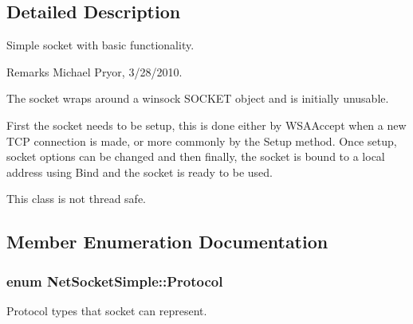 \subsection{Detailed Description}
Simple socket with basic functionality. \begin{DoxyRemark}{Remarks}
Michael Pryor, 3/28/2010.
\end{DoxyRemark}
The socket wraps around a winsock SOCKET object and is initially unusable.\par
\par


First the socket needs to be setup, this is done either by WSAAccept when a new TCP connection is made, or more commonly by the Setup method. Once setup, socket options can be changed and then finally, the socket is bound to a local address using Bind and the socket is ready to be used.\par
\par


This class is not thread safe. 

\subsection{Member Enumeration Documentation}
\hypertarget{class_net_socket_simple_a31450636f6fb9ece239c50f616e0d7b0}{
\subsubsection[{Protocol}]{\setlength{\rightskip}{0pt plus 5cm}enum {\bf NetSocketSimple::Protocol}}}
\label{class_net_socket_simple_a31450636f6fb9ece239c50f616e0d7b0}


Protocol types that socket can represent. 

